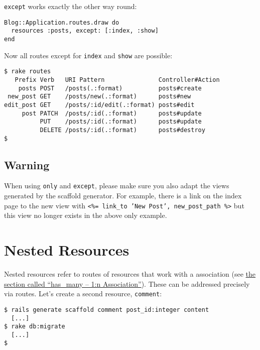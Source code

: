 \documentclass[a4paper]{book}
\begin{document}
\texttt{except} works exactly the other way round:

\begin{shaded}\begin{verbatim}
Blog::Application.routes.draw do
  resources :posts, except: [:index, :show]
end
\end{verbatim}\end{shaded}

Now all routes except for \texttt{index} and \texttt{show} are possible:

\begin{shaded}\begin{verbatim}
$ rake routes
   Prefix Verb   URI Pattern               Controller#Action
    posts POST   /posts(.:format)          posts#create
 new_post GET    /posts/new(.:format)      posts#new
edit_post GET    /posts/:id/edit(.:format) posts#edit
     post PATCH  /posts/:id(.:format)      posts#update
          PUT    /posts/:id(.:format)      posts#update
          DELETE /posts/:id(.:format)      posts#destroy
$
\end{verbatim}\end{shaded}

\subsection{Warning}\label{warning-11}

When using \texttt{only} and \texttt{except}, please make sure you also adapt the views generated by the scaffold generator. For example, there is a link on the index page to the new view with \texttt{\textless{}\%= link\_to 'New Post', new\_post\_path \%\textgreater{}} but this view no longer exists in the above only example.

\section{Nested Resources}\label{nested-resources}

Nested resources refer to routes of resources that work with a association (see \hyperref[activerecordux5fhasux5fmany]{the section called “has\_many -- 1:n Association”}). These can be addressed precisely via routes. Let's create a second resource, \texttt{comment}:

\begin{shaded}\begin{verbatim}
$ rails generate scaffold comment post_id:integer content
  [...]
$ rake db:migrate
  [...]
$
\end{verbatim}\end{shaded}
\end{document}
